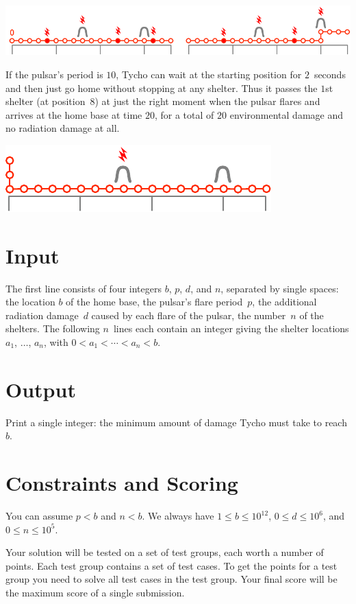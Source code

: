\includegraphics[width=.8\textwidth]{img/sample1_2.pdf}

If the pulsar's period is $10$, Tycho can wait at the starting position for $2$~seconds and then just go home without stopping at any shelter.
Thus it passes the $1$st shelter (at position~$8$) at just the right moment when the pulsar flares and arrives at the home base at time $20$, for a total of $20$ environmental damage and no radiation damage at all.

\includegraphics[width=.4\textwidth]{img/sample3.pdf}

\section*{Input}

The first line consists of four integers $b$, $p$, $d$, and $n$, separated by single spaces:
the location $b$ of the home base,
the pulsar's flare period~$p$,
the additional radiation damage~$d$ caused by each flare of the pulsar,
the number~$n$ of the shelters.
The following $n$~lines each contain an integer giving the shelter locations $a_1$, $\ldots$, $a_n$, with 
$0<a_1<\cdots <a_n< b$. %

\section*{Output}

Print a single integer: the minimum amount of damage Tycho must take to reach $b$.

\section*{Constraints and Scoring}

You can assume
$p < b$ %
and
$n < b$. %
We always have
$1\leq b\leq 10^{12}$, %
$0\leq d \leq 10^6$, %
and
$0\leq n \leq 10^5$. %

Your solution will be tested on a set of test groups, each worth a number of points.
Each test group contains a set of test cases.
To get the points for a test group you need to solve all test cases in the test group.
Your final score will be the maximum score of a single submission.

